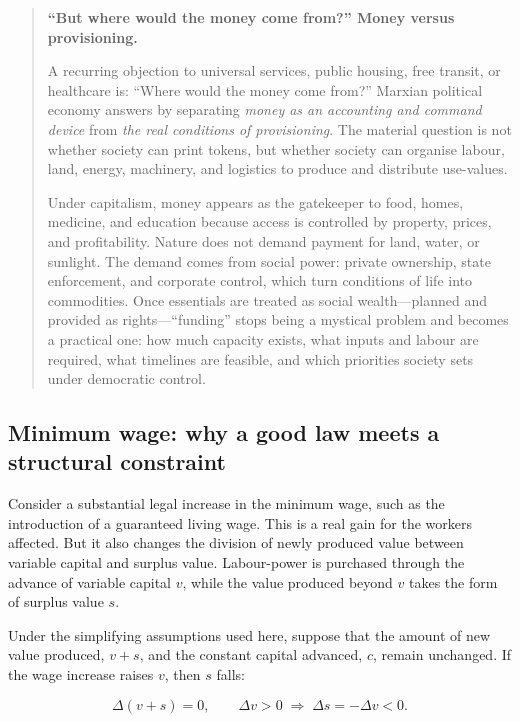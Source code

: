 \begin{quote}
\small
\textbf{``But where would the money come from?'' Money versus provisioning.}%

A recurring objection to universal services, public housing, free transit, or healthcare is:
``Where would the money come from?'' Marxian political economy answers by separating
\emph{money as an accounting and command device} from \emph{the real conditions of provisioning}.
The material question is not whether society can print tokens, but whether society can organise
labour, land, energy, machinery, and logistics to produce and distribute use-values.

Under capitalism, money appears as the gatekeeper to food, homes, medicine, and education because
access is controlled by property, prices, and profitability. Nature does not demand payment for
land, water, or sunlight. The demand comes from social power: private ownership, state enforcement,
and corporate control, which turn conditions of life into commodities. Once essentials are treated as
social wealth---planned and provided as rights---``funding'' stops being a mystical problem and becomes
a practical one: how much capacity exists, what inputs and labour are required, what timelines are
feasible, and which priorities society sets under democratic control.
\end{quote}

\subsection{Minimum wage: why a good law meets a structural constraint}
\label{sec:policy-minimum-wage}

Consider a substantial legal increase in the minimum wage, such as the
introduction of a guaranteed living wage. This is a real gain for the workers
affected. But it also changes the division of newly produced value between
variable capital and surplus value. Labour-power is purchased through the
advance of variable capital \(v\), while the value produced beyond \(v\) takes
the form of surplus value \(s\).

Under the simplifying assumptions used here, suppose that the amount of new
value produced, \(v+s\), and the constant capital advanced, \(c\), remain
unchanged. If the wage increase raises \(v\), then \(s\) falls:

\[
\Delta(v+s)=0,
\qquad
\Delta v>0
\;\Rightarrow\;
\Delta s=-\Delta v<0.
\]

